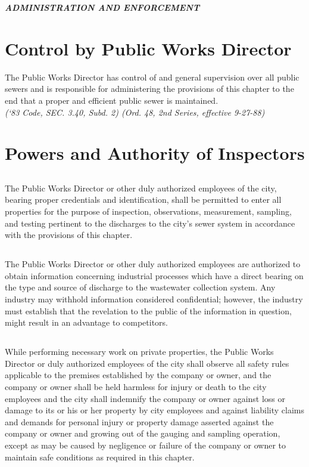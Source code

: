 \begin{center}
\emph{\textbf{\LARGE{ADMINISTRATION AND ENFORCEMENT}}}
\end{center}

\setcounter{section}{69}
\section{Control by Public Works Director}
The Public Works Director has control of and general supervision over all public sewers and is responsible for administering the provisions of this chapter to the end that a proper and efficient public sewer is maintained.\\
\emph{(‘83 Code, SEC. 3.40, Subd. 2) (Ord. 48, 2nd Series, effective 9-27-88)}
\section{Powers and Authority of Inspectors}
\subsection{}
The Public Works Director or other duly authorized employees of the city, bearing proper credentials and identification, shall be permitted to enter all properties for the purpose of inspection, observations, measurement, sampling, and testing pertinent to the discharges to the city’s sewer system in accordance with the provisions of this chapter.
\subsection{}
The Public Works Director or other duly authorized employees are authorized to obtain information concerning industrial processes which have a direct bearing on the type and source of discharge to the wastewater collection system.  Any industry may withhold information considered confidential; however, the industry must establish that the revelation to the public of the information in question, might result in an advantage to competitors.
\subsection{}
While performing necessary work on private properties, the Public Works Director or duly authorized employees of the city shall observe all safety rules applicable to the premises established by the company or owner, and the company or owner shall be held harmless for injury or death to the city employees and the city shall indemnify the company or owner against loss or damage to its or his or her property by city employees and against liability claims and demands for personal injury or property damage asserted against the company or owner and growing out of the gauging and sampling operation, except as may be caused by negligence or failure of the company or owner to maintain safe conditions as required in this chapter.
